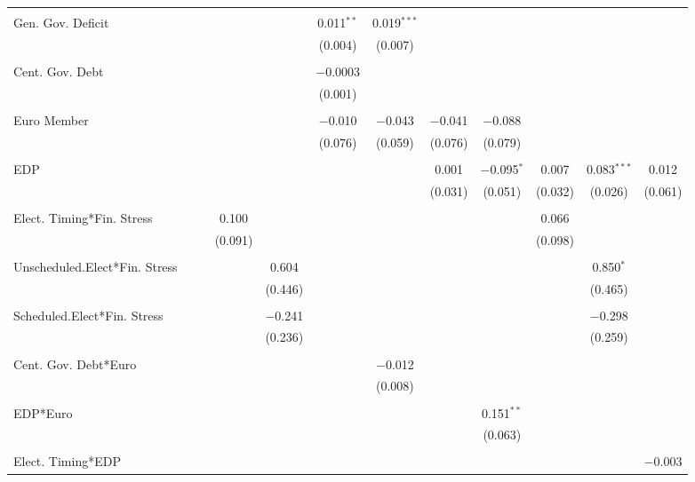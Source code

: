 \begin{table}[!htbp]
\begin{tabular}{@{\extracolsep{5pt}}lccccccccccc}
  & & & & & & & & & & & \\ 
 Gen. Gov. Deficit &  &  &  &  & 0.011$^{**}$ & 0.019$^{***}$ &  &  &  &  &  \\ 
  &  &  &  &  & (0.004) & (0.007) &  &  &  &  &  \\ 
  & & & & & & & & & & & \\ 
 Cent. Gov. Debt &  &  &  &  & $-$0.0003 &  &  &  &  &  &  \\ 
  &  &  &  &  & (0.001) &  &  &  &  &  &  \\ 
  & & & & & & & & & & & \\ 
 Euro Member &  &  &  &  & $-$0.010 & $-$0.043 & $-$0.041 & $-$0.088 &  &  &  \\ 
  &  &  &  &  & (0.076) & (0.059) & (0.076) & (0.079) &  &  &  \\ 
  & & & & & & & & & & & \\ 
 EDP &  &  &  &  &  &  & 0.001 & $-$0.095$^{*}$ & 0.007 & 0.083$^{***}$ & 0.012 \\ 
  &  &  &  &  &  &  & (0.031) & (0.051) & (0.032) & (0.026) & (0.061) \\ 
  & & & & & & & & & & & \\ 
 Elect. Timing*Fin. Stress &  &  & 0.100 &  &  &  &  &  & 0.066 &  &  \\ 
  &  &  & (0.091) &  &  &  &  &  & (0.098) &  &  \\ 
  & & & & & & & & & & & \\ 
 Unscheduled.Elect*Fin. Stress &  &  &  & 0.604 &  &  &  &  &  & 0.850$^{*}$ &  \\ 
  &  &  &  & (0.446) &  &  &  &  &  & (0.465) &  \\ 
  & & & & & & & & & & & \\ 
 Scheduled.Elect*Fin. Stress &  &  &  & $-$0.241 &  &  &  &  &  & $-$0.298 &  \\ 
  &  &  &  & (0.236) &  &  &  &  &  & (0.259) &  \\ 
  & & & & & & & & & & & \\ 
 Cent. Gov. Debt*Euro &  &  &  &  &  & $-$0.012 &  &  &  &  &  \\ 
  &  &  &  &  &  & (0.008) &  &  &  &  &  \\ 
  & & & & & & & & & & & \\ 
 EDP*Euro &  &  &  &  &  &  &  & 0.151$^{**}$ &  &  &  \\ 
  &  &  &  &  &  &  &  & (0.063) &  &  &  \\ 
  & & & & & & & & & & & \\ 
 Elect. Timing*EDP &  &  &  &  &  &  &  &  &  &  & $-$0.003 \\ 

\end{tabular}
\end{table}
